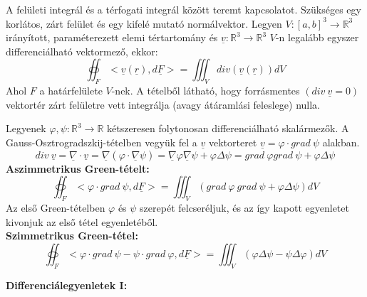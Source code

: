 \documentclass[11pt,a4paper]{article}
\begin{document}
    \begin{tcolorbox}[colback=red!5!white,colframe=red!60!black,title= 8. Gauss-Osztrogradszkij-tétel]
        A felületi integrál és a térfogati integrál között teremt kapcsolatot. Szükséges egy korlátos, zárt felület és egy kifelé mutató normálvektor. Legyen $V: [a,b]^3 \rightarrow \mathbb{R}^3$ irányított, paraméterezett elemi tértartomány és $\underline{v}: \mathbb{R}^3 \rightarrow \mathbb{R}^3$ $V$-n legalább egyszer differenciálható vektormező, ekkor:
        $$\oiint_F <\underline{v}(\underline{r}),d\underline{F}> = \iiint_V div(\underline{v}(\underline{r}))dV$$
        Ahol $F$ a határfelülete $V$-nek. A tételből látható, hogy forrásmentes $(div\ \underline{v} = 0)$ vektortér zárt felületre vett integrálja (avagy átáramlási feleslege) nulla.
    \end{tcolorbox}

    \begin{tcolorbox}[colback=red!5!white,colframe=red!60!black,title= 9. Green-tételek]
        Legyenek $\varphi, \psi: \mathbb{R}^3 \rightarrow \mathbb{R}$ kétszeresen folytonosan differenciálható skalármezők. A Gauss-Osztrogradszkij-tételben vegyük fel a $\underline{v}$ vektorteret $\underline{v} = \varphi \cdot grad\ \psi$ alakban.
        $$div\ \underline{v} = \underline{\nabla} \cdot \underline{v} = \underline{\nabla}(\varphi \cdot \underline{\nabla}\psi) = \underline{\nabla}\varphi\underline{\nabla}\psi + \varphi\Delta\psi = grad\ \varphi grad\ \psi + \varphi\Delta\psi$$
        \textbf{Aszimmetrikus Green-tételt:}
        $$\oiint_{F} <\varphi \cdot grad\ \psi, d\underline{F}> = \iiint_{V}(grad\ \varphi\ grad\ \psi + \varphi\Delta\psi)dV$$
        Az első Green-tételben $\varphi$ és $\psi$ szerepét felcseréljuk, és az így kapott egyenletet kivonjuk az első tétel egyenletéből. \\
        \textbf{Szimmetrikus Green-tétel:}
        $$\oiint_{F} <\varphi \cdot grad\ \psi - \psi \cdot grad\ \varphi, d\underline{F}> = \iiint_{V}(\varphi\Delta\psi - \psi\Delta\varphi)dV$$
    \end{tcolorbox}

\newpage
\textbf{Differenciálegyenletek I:}
\end{document}
